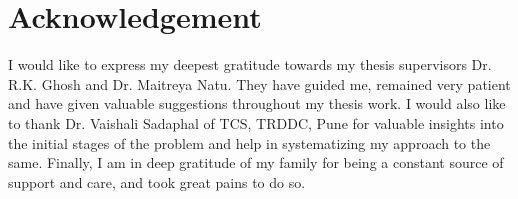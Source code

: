 \chapter*{Acknowledgement}
\thispagestyle{empty}
I would like to express my deepest gratitude towards my thesis supervisors Dr. R.K. Ghosh and Dr. Maitreya Natu. They have guided me, remained very patient and have given valuable suggestions throughout my thesis work. I would also like to thank Dr. Vaishali Sadaphal of TCS, TRDDC, Pune for valuable insights into the initial stages of the problem and help in systematizing my approach to the same. Finally, I am in deep gratitude of my family for being a constant source of support and care, and took great pains to do so.
\clearpage
